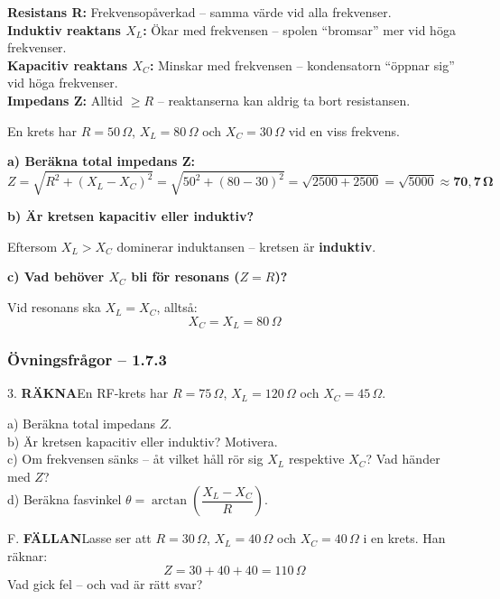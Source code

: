 \documentclass[a4paper,11pt,twoside]{book}
\newcommand{\emoji}[1]{{\emojifont #1}}
\newcommand{\qrakna}{\colorbox{bluepale}{\textcolor{bluedark}{\headingfont\bfseries\tiny RÄKNA}}}
\newcommand{\qfallan}{\colorbox{ljusbrun}{\textcolor{kakao}{\headingfont\bfseries\tiny FÄLLAN}}}
\begin{document}
\begin{bluebox}[title={\emoji{🔑} Nyckelsamband -- impedans}]
\textbf{Resistans R:} Frekvensopåverkad -- samma värde vid alla frekvenser.\\
\textbf{Induktiv reaktans $X_L$:} Ökar med frekvensen -- spolen ``bromsar'' mer vid höga frekvenser.\\
\textbf{Kapacitiv reaktans $X_C$:} Minskar med frekvensen -- kondensatorn ``öppnar sig'' vid höga frekvenser.\\
\textbf{Impedans Z:} Alltid $\geq R$ -- reaktanserna kan aldrig ta bort resistansen.
\end{bluebox}

\begin{worked}[title={Räkneexempel 1.7.3 -- Impedans i en RLC-krets}]
En krets har $R = 50\,\Omega$, $X_L = 80\,\Omega$
och $X_C = 30\,\Omega$ vid en viss frekvens.

\textbf{a) Beräkna total impedans Z:}
\[ Z = \sqrt{R^2 + (X_L - X_C)^2} = \sqrt{50^2 + (80-30)^2}
   = \sqrt{2500 + 2500} = \sqrt{5000} \approx \mathbf{70{,}7\,\Omega} \]

\textbf{b) Är kretsen kapacitiv eller induktiv?}

Eftersom $X_L > X_C$ dominerar induktansen --
kretsen är \textbf{induktiv}.

\textbf{c) Vad behöver $X_C$ bli för resonans ($Z = R$)?}

Vid resonans ska $X_L = X_C$, alltså:
\[ X_C = X_L = 80\,\Omega \]
\end{worked}

\subsubsection*{Övningsfrågor -- 1.7.3}

\begin{qblock}{3.}
\qrakna\quad En RF-krets har $R = 75\,\Omega$,
$X_L = 120\,\Omega$ och $X_C = 45\,\Omega$.

a) Beräkna total impedans $Z$.\\
b) Är kretsen kapacitiv eller induktiv? Motivera.\\
c) Om frekvensen sänks -- åt vilket håll rör sig
$X_L$ respektive $X_C$? Vad händer med $Z$?\\
d) Beräkna fasvinkel $\theta = \arctan\!\left(\dfrac{X_L - X_C}{R}\right)$.
\end{qblock}

\begin{qblock}{F.}
\qfallan\quad Lasse ser att $R = 30\,\Omega$,
$X_L = 40\,\Omega$ och $X_C = 40\,\Omega$ i en krets.
Han räknar:
\[ Z = 30 + 40 + 40 = 110\,\Omega \]
Vad gick fel -- och vad är rätt svar?
\end{qblock}
\end{document}
